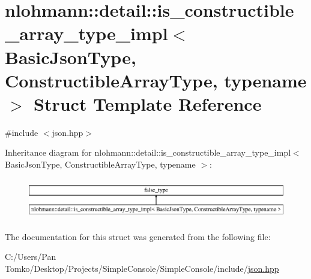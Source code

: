 \hypertarget{structnlohmann_1_1detail_1_1is__constructible__array__type__impl}{}\section{nlohmann\+::detail\+::is\+\_\+constructible\+\_\+array\+\_\+type\+\_\+impl$<$ Basic\+Json\+Type, Constructible\+Array\+Type, typename $>$ Struct Template Reference}
\label{structnlohmann_1_1detail_1_1is__constructible__array__type__impl}


{\ttfamily \#include $<$json.\+hpp$>$}

Inheritance diagram for nlohmann\+::detail\+::is\+\_\+constructible\+\_\+array\+\_\+type\+\_\+impl$<$ Basic\+Json\+Type, Constructible\+Array\+Type, typename $>$\+:\begin{figure}[H]
\begin{center}
\leavevmode
\includegraphics[height=1.809370cm]{d8/d8b/structnlohmann_1_1detail_1_1is__constructible__array__type__impl}
\end{center}
\end{figure}


The documentation for this struct was generated from the following file\+:\begin{DoxyCompactItemize}
\item 
C\+:/\+Users/\+Pan Tomko/\+Desktop/\+Projects/\+Simple\+Console/\+Simple\+Console/include/\mbox{\hyperlink{json_8hpp}{json.\+hpp}}\end{DoxyCompactItemize}
